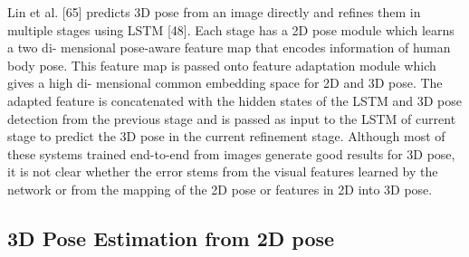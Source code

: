 Lin et al. [65] predicts 3D pose from an image directly and refines them in multiple
stages using LSTM [48]. Each stage has a 2D pose module which learns a two di-
mensional pose-aware feature map that encodes information of human body pose.
This feature map is passed onto feature adaptation module which gives a high di-
mensional common embedding space for 2D and 3D pose. The adapted feature is
concatenated with the hidden states of the LSTM and 3D pose detection from the
previous stage and is passed as input to the LSTM of current stage to predict the
3D pose in the current refinement stage.
Although most of these systems trained end-to-end from images generate good
results for 3D pose, it is not clear whether the error stems from the visual features
learned by the network or from the mapping of the 2D pose or features in 2D into
3D pose.

\subsection{3D Pose Estimation from 2D pose}

